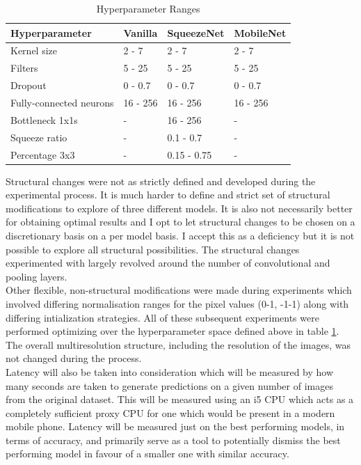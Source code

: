 \documentclass{article}
\begin{document}
\begin{table}[h!]
  \begin{center}
    \caption{Hyperparameter Ranges}
    \label{tab:table1}
    \begin{tabular}{l|l|l|l}
      \textbf{Hyperparameter} & \textbf{Vanilla} &                          \textbf{SqueezeNet} & \textbf{MobileNet}\\
      \hline
      Kernel size & 2 - 7 & 2 - 7 & 2 - 7\\
      Filters & 5 - 25 & 5 - 25 & 5 - 25\\
      Dropout & 0 - 0.7 & 0 - 0.7 & 0 - 0.7\\
      Fully-connected neurons & 16 - 256 & 16 - 256 & 16 - 256\\
      Bottleneck 1x1s & - & 16 - 256 & - \\
      Squeeze ratio & - & 0.1 - 0.7 & - \\
      Percentage 3x3 & - & 0.15 - 0.75 & - \\
    \end{tabular}
  \end{center}
\end{table}

Structural changes were not as strictly defined and developed during the experimental process. It is much harder to define and strict set of structural modifications to explore of three different models. It is also not necessarily better for obtaining optimal results and I opt to let structural changes to be chosen on a discretionary basis on a per model basis. I accept this as a deficiency but it is not possible to explore all structural possibilities. The structural changes experimented with largely revolved around the number of convolutional and pooling layers. \\

Other flexible, non-structural modifications were made during experiments which involved differing normalisation ranges for the pixel values (0-1, -1-1) along with differing intialization strategies. All of these subsequent experiments were performed optimizing over the hyperparameter space defined above in table \ref{tab:table1}. The overall multiresolution structure, including the resolution of the images, was not changed during the process. \\

Latency will also be taken into consideration which will be measured by how many seconds are taken to generate predictions on a given number of images from the original dataset. This will be measured using an i5 CPU which acts as a completely sufficient proxy CPU for one which would be present in a modern mobile phone. Latency will be measured just on the best performing models, in terms of accuracy, and primarily serve as a tool to potentially dismiss the best performing model in favour of a smaller one with similar accuracy. \\
\end{document}
